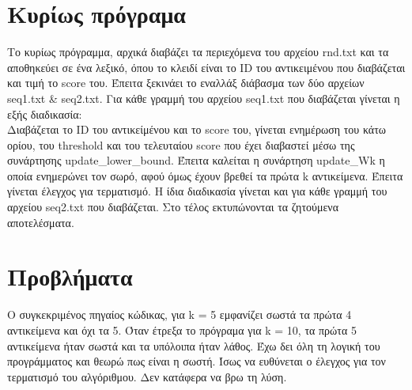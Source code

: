 \documentclass{article}[40pt]
\begin{document}
\section{Κυρίως πρόγραμα}
Το κυρίως πρόγραμμα, αρχικά διαβάζει τα περιεχόμενα του αρχείου rnd.txt και τα αποθηκεύει σε ένα λεξικό, όπου το κλειδί είναι το ID του αντικειμένου που διαβάζεται και τιμή το score του. Έπειτα ξεκινάει το εναλλάξ διάβασμα των δύο αρχείων seq1.txt \& seq2.txt. Για κάθε γραμμή του αρχείου seq1.txt που διαβάζεται γίνεται η εξής διαδικασία:\\
Διαβάζεται το ID του αντικείμένου και το score του, γίνεται ενημέρωση του κάτω ορίου, του threshold και του τελευταίου score που έχει διαβαστεί μέσω της συνάρτησης update\_lower\_bound. Έπειτα καλείται η συνάρτηση update\_Wk η οποία ενημερώνει τον σωρό, αφού όμως έχουν βρεθεί τα πρώτα k αντικείμενα. Έπειτα γίνεται έλεγχος για τερματισμό. Η ίδια διαδικασία γίνεται και για κάθε γραμμή του αρχείου seq2.txt που διαβάζεται. Στο τέλος εκτυπώνονται τα ζητούμενα αποτελέσματα.
\section{Προβλήματα}
Ο συγκεκριμένος πηγαίος κώδικας, για k = 5 εμφανίζει σωστά τα πρώτα 4 αντικείμενα και όχι τα 5. Όταν έτρεξα το πρόγραμα για k = 10, τα πρώτα 5 αντικείμενα ήταν σωστά και τα υπόλοιπα ήταν λάθος. Έχω δει όλη τη λογική του προγράμματος και θεωρώ πως είναι η σωστή. Ίσως να ευθύνεται ο έλεγχος για τον τερματισμό του αλγόριθμου. Δεν κατάφερα να βρω τη λύση. 
\end{document}

